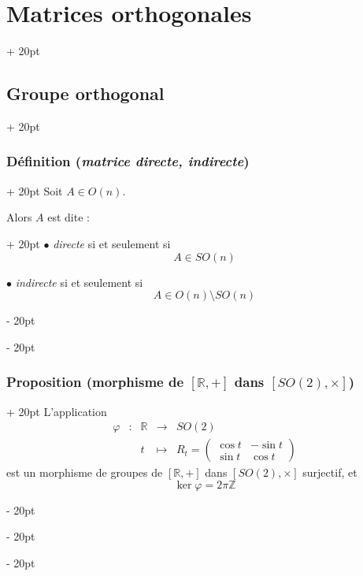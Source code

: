 \documentclass[a4paper, 12pt, twoside]{article}
\newcommand{\Z}{\mathbb{Z}} %
\newcommand{\R}{\mathbb{R}} %
\newcommand{\ind}[1][20pt]{\advance\leftskip + #1}
\newcommand{\deind}[1][20pt]{\advance\leftskip - #1}
\newenvironment{indt}[2][20pt]{#2 \par \ind[#1]}{\par \deind} %
\begin{document}
\begin{indt}{\section{Matrices orthogonales}}
\begin{indt}{\subsection{Groupe orthogonal}}
            \vspace{12pt}
            
            \begin{indt}{\subsubsection{Définition (\textit{matrice directe, indirecte})}}
                Soit $A \in O(n)$.

                \begin{indt}{Alors $A$ est dite :}
                    $\bullet$ \emph{directe} si et seulement si
                    \[
                        A \in SO(n)
                    \]

                    $\bullet$ \emph{indirecte} si et seulement si
                    \[
                        A \in O(n) \setminus SO(n)
                    \]
                \end{indt}
            \end{indt}

            \vspace{12pt}
            
            \begin{indt}{\subsubsection{Proposition (morphisme de $[\R, +]$ dans $[SO(2), \times]$)}}
                L'application
                \[
                    \begin{array}{ccccl}
                        \varphi & : & \R & \longrightarrow & SO(2)
                        \\
                        &&t & \longmapsto &
                        R_t =
                        \begin{pmatrix}
                            \cos t & -\sin t
                            \\
                            \sin t & \cos t
                        \end{pmatrix}
                    \end{array}
                \]
                est un morphisme de groupes de $[\R, +]$ dans $[SO(2), \times]$ surjectif, et
                \[
                    \ker \varphi = 2\pi \Z
                \]
            \end{indt}

            \vspace{12pt}
            

\end{indt}
\end{indt}
\end{document}
